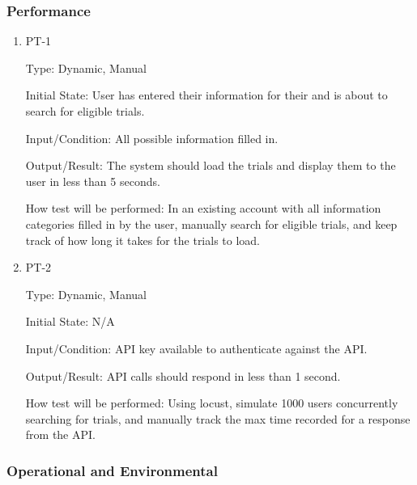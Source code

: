 \documentclass[12pt, titlepage]{article}
\begin{document}
\subsubsection{Performance}
		
\begin{enumerate}

\item{PT-1\\}

Type: Dynamic, Manual
					
Initial State: User has entered their information for their and is about to search for eligible trials.
					
Input/Condition: All possible information filled in.
					
Output/Result: The system should load the trials and display them to the user in less than 5 seconds.
					
How test will be performed: In an existing account with all information categories filled in by the user, manually search for eligible trials, 
and keep track of how long it takes for the trials to load.
					
\item{PT-2\\}

Type: Dynamic, Manual
					
Initial State: N/A
					
Input/Condition: API key available to authenticate against the API.
					
Output/Result: API calls should respond in less than 1 second.
					
How test will be performed: Using locust, simulate 1000 users concurrently searching for trials, and manually track 
the max time recorded for a response from the API.

\end{enumerate}

\subsubsection{Operational and Environmental}
		
\end{document}
